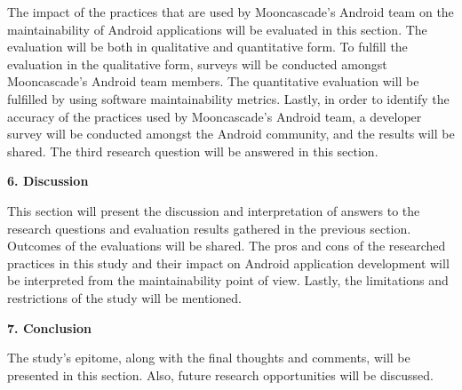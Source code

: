 The impact of the practices that are used by Mooncascade's Android team on the maintainability of Android applications will be evaluated in this section. The evaluation will be both in qualitative and quantitative form. To fulfill the evaluation in the qualitative form, surveys will be conducted amongst Mooncascade's Android team members. The quantitative evaluation will be fulfilled by using software maintainability metrics. Lastly, in order to identify the accuracy of the practices used by Mooncascade's Android team, a developer survey will be conducted amongst the Android community, and the results will be shared. The third research question will be answered in this section.

\noindent\textbf{6. Discussion}

This section will present the discussion and interpretation of answers to the research questions and evaluation results gathered in the previous section. Outcomes of the evaluations will be shared. The pros and cons of the researched practices in this study and their impact on Android application development will be interpreted from the maintainability point of view. Lastly, the limitations and restrictions of the study will be mentioned.

\noindent\textbf{7. Conclusion}

The study's epitome, along with the final thoughts and comments, will be presented in this section. Also, future research opportunities will be discussed.
